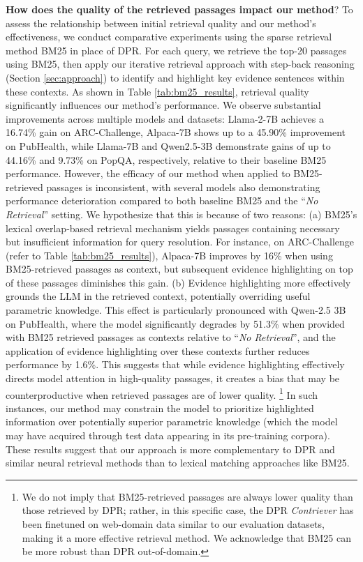 \textbf{How does the quality of the retrieved passages impact our method}? To assess the relationship between initial retrieval quality and our method's effectiveness, we conduct comparative experiments using the sparse retrieval method BM25 \cite{Robertson2009ThePR} in place of DPR. For each query, we retrieve the top-20 passages using BM25, then apply our iterative retrieval approach with step-back reasoning (Section \ref{sec:approach}) to identify and highlight key evidence sentences within these contexts. As shown in Table \ref{tab:bm25_results}, retrieval quality significantly influences our method's performance. We observe substantial improvements across multiple models and datasets: Llama-2-7B achieves a 16.74\% gain on ARC-Challenge, Alpaca-7B shows up to a 45.90\% improvement on PubHealth, while Llama-7B and Qwen2.5-3B demonstrate gains of up to 44.16\% and 9.73\% on PopQA, respectively, relative to their baseline BM25 performance. However, the efficacy of our method when applied to BM25-retrieved passages is inconsistent, with several models also demonstrating performance deterioration compared to both baseline BM25 and the ``\textit{No Retrieval}'' setting. We hypothesize that this is because of two reasons: (a) 
BM25's lexical overlap-based retrieval mechanism yields passages containing necessary but insufficient information for query resolution.
For instance, on ARC-Challenge (refer to Table \ref{tab:bm25_results}), Alpaca-7B improves by 16\% when using BM25-retrieved passages as context, but subsequent evidence highlighting on top of these passages diminishes this gain. (b) Evidence highlighting more effectively grounds the LLM in the retrieved context, potentially overriding useful parametric knowledge. This effect is particularly pronounced with Qwen-2.5 3B on PubHealth, where the model significantly degrades by 51.3\% when provided with BM25 retrieved passages as contexts relative to ``\textit{No Retrieval}'',  and the application of evidence highlighting over these contexts further reduces performance by 1.6\%. This suggests that while evidence highlighting effectively directs model attention in high-quality passages, it creates a bias that may be counterproductive when retrieved passages are of lower quality. \footnote{We do not imply that BM25-retrieved passages are always lower quality than those retrieved by DPR; rather, in this specific case, the DPR \textit{Contriever} has been finetuned on web-domain data \cite{bajaj2018msmarcohumangenerated} similar to our evaluation datasets, making it a more effective retrieval method. We acknowledge that BM25 can be more robust than DPR out-of-domain.}
In such instances, our method may constrain the model to prioritize highlighted information over potentially superior parametric knowledge (which the model may have acquired through test data appearing in its pre-training corpora). These results suggest that our approach is more complementary to DPR and similar neural retrieval methods than to lexical matching approaches like BM25.

